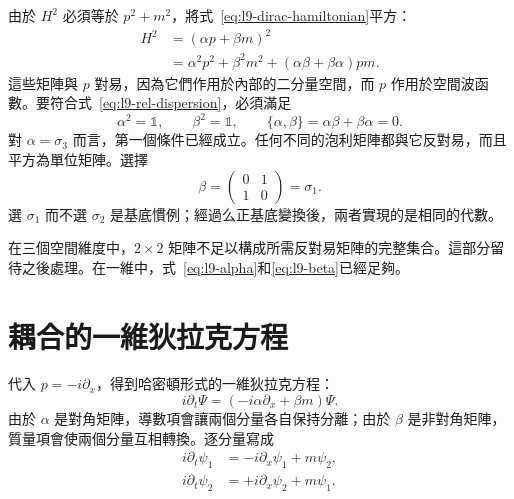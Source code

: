 由於 \(H^2\) 必須等於 \(p^2+m^2\)，將式~\eqref{eq:l9-dirac-hamiltonian}平方：
\begin{align}
H^2
&=(\alpha p+\beta m)^2\\
&=\alpha^2p^2+\beta^2m^2
+(\alpha\beta+\beta\alpha)pm.
\label{eq:l9-square-dirac}
\end{align}
這些矩陣與 \(p\) 對易，因為它們作用於內部的二分量空間，而 \(p\) 作用於空間波函數。要符合式~\eqref{eq:l9-rel-dispersion}，必須滿足
\begin{equation}
\alpha^2=\mathbb{1},
\qquad
\beta^2=\mathbb{1},
\qquad
\{\alpha,\beta\}
=\alpha\beta+\beta\alpha=0.
\label{eq:l9-dirac-algebra}
\end{equation}
對 \(\alpha=\sigma_3\) 而言，第一個條件已經成立。任何不同的泡利矩陣都與它反對易，而且平方為單位矩陣。選擇
\begin{equation}
\beta=
\begin{pmatrix}
0&1\\
1&0
\end{pmatrix}
=\sigma_1.
\label{eq:l9-beta}
\end{equation}
選 \(\sigma_1\) 而不選 \(\sigma_2\) 是基底慣例；經過么正基底變換後，兩者實現的是相同的代數。

\begin{classroomqa}
\end{classroomqa}

\begin{classroomqa}
\end{classroomqa}

在三個空間維度中，\(2\times2\) 矩陣不足以構成所需反對易矩陣的完整集合。這部分留待之後處理。在一維中，式~\eqref{eq:l9-alpha}和\eqref{eq:l9-beta}已經足夠。

\section{耦合的一維狄拉克方程}

代入 \(p=-i\partial_x\)，得到哈密頓形式的一維狄拉克方程：
\begin{equation}
i\partial_t\Psi
=\left(-i\alpha\partial_x+\beta m\right)\Psi.
\label{eq:l9-one-dimensional-dirac}
\end{equation}
由於 \(\alpha\) 是對角矩陣，導數項會讓兩個分量各自保持分離；由於 \(\beta\) 是非對角矩陣，質量項會使兩個分量互相轉換。逐分量寫成
\begin{align}
i\partial_t\psi_1
&=-i\partial_x\psi_1+m\psi_2,
\label{eq:l9-dirac-component-one}\\
i\partial_t\psi_2
&=+i\partial_x\psi_2+m\psi_1.
\label{eq:l9-dirac-component-two}
\end{align}

